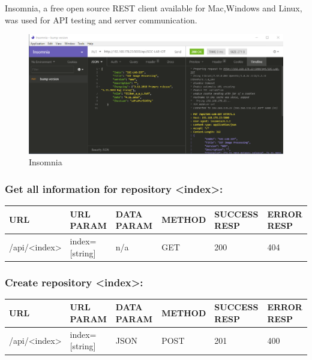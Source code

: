 Insomnia, a free open source REST client available for Mac,Windows and Linux, was used for API testing and server communication.

\begin{figure}[h]
\centering
\includegraphics[width=1\textwidth]{sections/methodology/insomnia.png}
\caption{\label{fig:gic} Insomnia}
\end{figure}




\subsubsection{Get all information for repository <index>:}
\begin{table}[h]
    \begin{tabular}[h]{llllll}
    URL          & URL PARAM      & DATA PARAM  & METHOD & SUCCESS RESP & ERROR RESP \\ \hline
    /api/<index> & index=[string] & n/a    & GET   & 200              & 404            \\ 
    \end{tabular}
\end{table}



\subsubsection{Create repository <index>:}
\begin{table}[h]
    \begin{tabular}[h]{llllll}
    URL          & URL PARAM      & DATA PARAM  & METHOD & SUCCESS RESP & ERROR RESP \\ \hline
    /api/<index> & index=[string] & JSON    & POST   & 201              & 400            \\ 
    \end{tabular}
\end{table}

